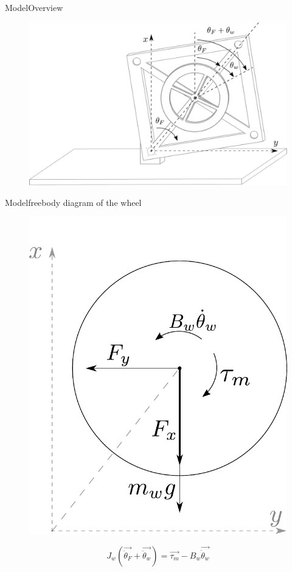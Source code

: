 \begin{frame}{Model}{Overview}
	\begin{figure}[H]
		\centering
		\includegraphics[scale=0.5]{Pictures/mechanicalSystem.pdf}
	\end{figure}
\end{frame}

\begin{frame}{Model}{freebody diagram of the wheel}
	\begin{figure}[H]
		\centering
		\includegraphics[scale=0.40]{Pictures/freeBodyWheel.pdf}
	\end{figure}
	\begin{displaymath}	
	  \si{ J_w (\vec{\ddot{\theta}_F} + \vec{\ddot{\theta}_w}) =} 
	  \si{ \vec{\tau_m} - B_w \vec{\dot{\theta}_w }}
	\end{displaymath}
\end{frame}

